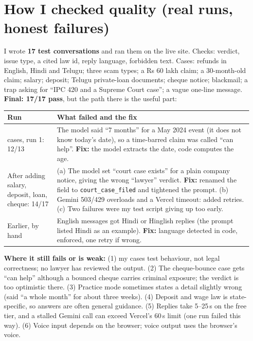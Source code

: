 \documentclass[9pt,a4paper]{extarticle}
\begin{document}
\section{How I checked quality (real runs, honest failures)}
I wrote \textbf{17 test conversations} and ran them on the live site. Checks: verdict, issue type, a cited law id, reply language, forbidden text. Cases: refunds in English, Hindi and Telugu; three scam types; a Rs 60 lakh claim; a 30-month-old claim; salary; deposit; Telugu private-loan documents; cheque notice; blackmail; a trap asking for ``IPC 420 and a Supreme Court case''; a vague one-line message. \textbf{\textcolor{OliveGreen}{Final: 17/17 pass}}, but the path there is the useful part:

\smallskip
\begin{tabularx}{\linewidth}{|>{\raggedright\arraybackslash}p{33mm}|Y|}
\hline
\textbf{Run} & \textbf{What failed and the fix} \\  cases, run 1: 12/13 & The model said ``7 months'' for a May 2024 event (it does not know today's date), so a time-barred claim was called ``can help''. \textbf{Fix:} the model extracts the date, code computes the age. \\ \hline
After adding salary, deposit, loan, cheque: 14/17 & (a) The model set ``court case exists'' for a plain company notice, giving the wrong ``lawyer'' verdict. \textbf{Fix:} renamed the field to \texttt{court\_case\_filed} and tightened the prompt. (b) Gemini 503/429 overloads and a Vercel timeout: added retries. (c) Two failures were my test script giving up too early. \\ \hline
Earlier, by hand & English messages got Hindi or Hinglish replies (the prompt listed Hindi as an example). \textbf{Fix:} language detected in code, enforced, one retry if wrong. \\ \hline
\end{tabularx}

\smallskip
\textbf{Where it still fails or is weak:} (1) my cases test behaviour, not legal correctness; no lawyer has reviewed the output. (2) The cheque-bounce case gets ``can help'' although a bounced cheque carries criminal exposure; the verdict is too optimistic there. (3) Practice mode sometimes states a detail slightly wrong (said ``a whole month'' for about three weeks). (4) Deposit and wage law is state-specific, so answers are often general guidance. (5) Replies take 5--25\,s on the free tier, and a stalled Gemini call can exceed Vercel's 60\,s limit (one run failed this way). (6) Voice input depends on the browser; voice output uses the browser's voice.
\end{document}
